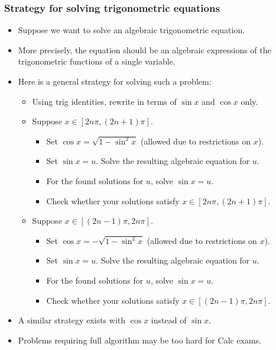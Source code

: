 \begin{frame}
\frametitle{Strategy for solving trigonometric equations}
\begin{itemize}
\item Suppose we want to solve an algebraic trigonometric equation. 
\item More precisely, the equation should be an algebraic expressions of the trigonometric functions of a single variable. 
\item Here is a general strategy for solving such a problem:
\begin{itemize}
\item Using trig identities, rewrite in terms of $\sin x  $ and $\cos x$ only. 
\item Suppose $x\in [2n\pi, (2n+1)\pi]$. 
\begin{itemize}
\item Set $\cos x= \sqrt{1-\sin^2x} $ (allowed due to restrictions on $x$).
\item Set $\sin x=u$. Solve the resulting algebraic equation for $u$.
\item For the found solutions for $u$, solve $\sin x=u$.
\item Check whether your solutions satisfy $x\in [2n\pi, (2n+1)\pi]$.
\end{itemize}

\item Suppose  $x\in [(2n-1)\pi, 2n\pi]$. 
\begin{itemize}
\item Set $\cos x= -\sqrt{1-\sin^2x} $ (allowed due to restrictions on $x$).
\item Set $\sin x=u$. Solve the resulting algebraic equation for $u$.
\item For the found solutions for $u$, solve $\sin x=u$.
\item Check whether your solutions satisfy $x\in [(2n-1)\pi, 2n\pi]$.
\end{itemize}

\end{itemize}
\item A similar strategy exists with $\cos x$ instead of $\sin x$.
\item Problems requiring full algorithm may be too hard for Calc exams.
\end{itemize}
\end{frame}
